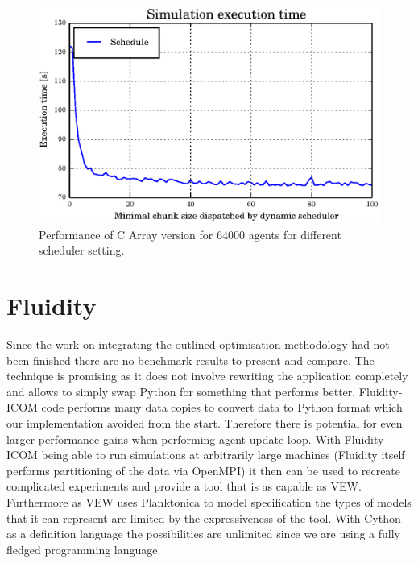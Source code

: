 \documentclass[12pt, a4paper]{report}
\begin{document}
\begin{figure}[H]
  \begin{center}
    \includegraphics[width=\columnwidth]{graphs/schedule-low.eps}
    \caption{Performance of C Array version for 64000 agents for different scheduler setting.}
    \label{fig:schedule-low}
  \end{center}
\end{figure}

\section{Fluidity}\label{sec:fluid-appcl}
Since the work on integrating the outlined optimisation methodology had
not been finished there are no benchmark results to present and compare.
The technique is promising as it does not involve rewriting the application
completely and allows to simply swap Python for something that performs
better. Fluidity-ICOM code performs many data copies to convert data
to Python format which our implementation avoided from the start. Therefore
there is potential for even larger performance gains when performing
agent update loop. With Fluidity-ICOM being able to run simulations
at arbitrarily large machines (Fluidity itself performs partitioning
of the data via OpenMPI) it then can be used to recreate complicated
experiments and provide a tool that is as capable as VEW. Furthermore
as VEW uses Planktonica to model specification the types of models that
it can represent are limited by the expressiveness of the tool. With
Cython as a definition language the possibilities are unlimited  since
we are using a fully fledged programming language.
\end{document}
